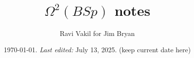 \newcommand{\aff}{\rm{aff}}

\newcommand{\Gr}{\rm{Gr}}
\newcommand{\LGr}{\rm{LGr}}
\newcommand{\SAG}{\rm{SpAfGr}}
\newcommand{\LSG}{\rm{LgStGr}}

\newcommand{\jalpha}{\mathord{j\mkern-7mu\alpha}}



\newcommand{\remind}[1]{{\bf[{\large TODO:  } #1]}}
\newcommand{\lremind}[1]{{\bf[label:  #1]}}
\newcommand{\notation}[1]{}
\renewcommand{\lremind}[1]{{}}

\newcommand{\ravi}[1]{{\bf [#1 --- Ravi]}}
\newcommand{\hidden}[1]{\footnote{Hidden:  #1}}

\newcommand{\cut}[1]{}


\newcommand{\leftbox}[1]{      \begin{flushleft}\fbox{ \parbox{25em}{
#1        }}\end{flushleft}
}\newcommand{\centerbox}[1]{      \begin{center}\fbox{ \parbox{25em}{
#1        }}\end{center}
}
\newcommand{\rightbox}[1]{      \begin{flushright}\fbox{ \parbox{25em}{
#1        }}\end{flushright}
}



\pagestyle{plain}
\title{\Large{$\Omega^2(BSp)$ notes}}
\author{Ravi Vakil for Jim Bryan}
\date{\today .   {\em Last edited:}
  July 13, 2025. (keep current date here)  }
\maketitle
\tableofcontents


